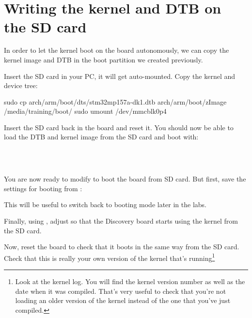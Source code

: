 \section{Writing the kernel and DTB on the SD card}

In order to let the kernel boot on the board autonomously, we can
copy the kernel image and DTB in the boot partition we created
previously.

Insert the SD card in your PC, it will get auto-mounted. Copy the
kernel and device tree:

\begin{terminalinput}
sudo cp arch/arm/boot/dts/stm32mp157a-dk1.dtb arch/arm/boot/zImage /media/training/boot/
sudo umount /dev/mmcblk0p4
\end{terminalinput}

Insert the SD card back in the board and reset it. You should now be
able to load the DTB and kernel image from the SD card and boot with:

\\
\\

You are now ready to modify  to boot the board
from SD card. But first, save the settings for booting from
:


This will be useful to switch back to  booting mode
later in the labs.

Finally, using , adjust  so that
the Discovery board starts using the kernel from the SD card.

Now, reset the board to check that it boots in the same way from the
SD card. Check that this is really your own version of the kernel
that's running\footnote{Look at the kernel log. You will find the
kernel version number as well as the date when it was compiled.
That's very useful to check that you're not loading an older version
of the kernel instead of the one that you've just compiled.}

